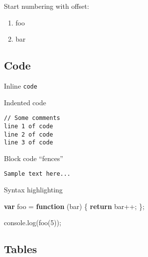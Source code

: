 \documentclass[]{article}
\newenvironment{Shaded}{}{}
\newcommand{\KeywordTok}[1]{\textcolor[rgb]{0.00,0.44,0.13}{\textbf{{#1}}}}
\newcommand{\DecValTok}[1]{\textcolor[rgb]{0.25,0.63,0.44}{{#1}}}
\newcommand{\VariableTok}[1]{\textcolor[rgb]{0.10,0.09,0.49}{{#1}}}
\newcommand{\ControlFlowTok}[1]{\textcolor[rgb]{0.00,0.44,0.13}{\textbf{{#1}}}}
\newcommand{\OperatorTok}[1]{\textcolor[rgb]{0.40,0.40,0.40}{{#1}}}
\newcommand{\AttributeTok}[1]{\textcolor[rgb]{0.49,0.56,0.16}{{#1}}}
\newcommand{\NormalTok}[1]{{#1}}
\providecommand{\tightlist}{%
  \setlength{\itemsep}{0pt}\setlength{\parskip}{0pt}}
\begin{document}
Start numbering with offset:

\begin{enumerate}
\tightlist
\item
  foo
\item
  bar
\end{enumerate}

\subsection{Code}\label{code}

Inline \texttt{code}

Indented code

\begin{verbatim}
// Some comments
line 1 of code
line 2 of code
line 3 of code
\end{verbatim}

Block code ``fences''

\begin{verbatim}
Sample text here...
\end{verbatim}

Syntax highlighting

\begin{Shaded}
\begin{Highlighting}[]
\KeywordTok{var} \NormalTok{foo }\OperatorTok{=} \KeywordTok{function} \NormalTok{(bar) }\OperatorTok{\{}
  \ControlFlowTok{return} \NormalTok{bar}\OperatorTok{++;}
\OperatorTok{\};}

\VariableTok{console}\NormalTok{.}\AttributeTok{log}\NormalTok{(}\AttributeTok{foo}\NormalTok{(}\DecValTok{5}\NormalTok{))}\OperatorTok{;}
\end{Highlighting}
\end{Shaded}

\subsection{Tables}\label{tables}
\end{document}
